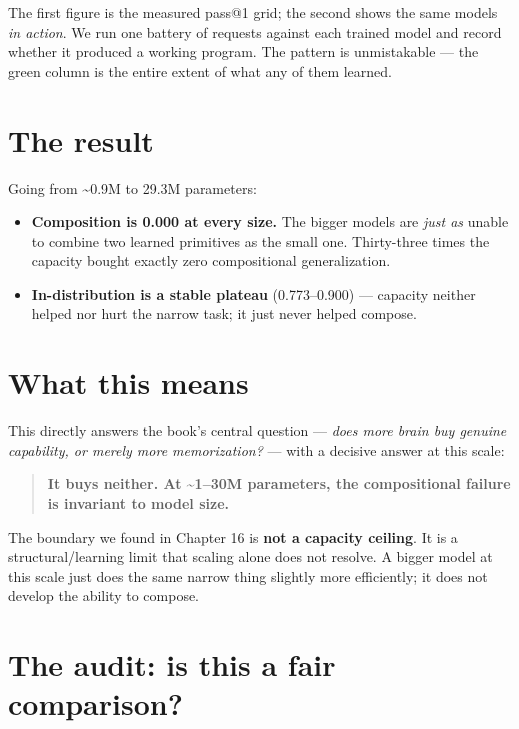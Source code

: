 The first figure is the measured pass@1 grid; the second shows the same
models \emph{in action}. We run one battery of requests against each
trained model and record whether it produced a working program. The
pattern is unmistakable --- the green column is the entire extent of
what any of them learned.

\section{The result}\label{the-result}

Going from \textasciitilde0.9M to 29.3M parameters:

\begin{itemize}
\tightlist
\item
  \textbf{Composition is 0.000 at every size.} The bigger models are
  \emph{just as} unable to combine two learned primitives as the small
  one. Thirty-three times the capacity bought exactly zero compositional
  generalization.
\item
  \textbf{In-distribution is a stable plateau} (0.773--0.900) ---
  capacity neither helped nor hurt the narrow task; it just never helped
  compose.
\end{itemize}

\section{What this means}\label{what-this-means}

This directly answers the book's central question --- \emph{does more
brain buy genuine capability, or merely more memorization?} --- with a
decisive answer at this scale:

\begin{quote}
\textbf{It buys neither. At \textasciitilde1--30M parameters, the
compositional failure is invariant to model size.}
\end{quote}

The boundary we found in Chapter 16 is \textbf{not a capacity ceiling}.
It is a structural/learning limit that scaling alone does not resolve. A
bigger model at this scale just does the same narrow thing slightly more
efficiently; it does not develop the ability to compose.

\section{The audit: is this a fair
comparison?}\label{the-audit-is-this-a-fair-comparison}


